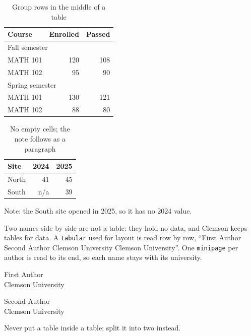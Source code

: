 \documentclass[12pt]{article}
\begin{document}
\begin{table}\centering
  \caption{Group rows in the middle of a table}
  \begin{tabular}{lrr}
    \toprule Course   & Enrolled & Passed \\ \midrule
    \multicolumn{3}{l}{Fall semester} \\
    MATH 101 & 120 & 108 \\
    MATH 102 & 95  & 90  \\
    \multicolumn{3}{l}{Spring semester} \\
    MATH 101 & 130 & 121 \\
    MATH 102 & 88  & 80  \\ \bottomrule
  \end{tabular}
\end{table}
\begin{table}\centering
  \caption[No empty cells]{No empty cells; the note follows as a paragraph}
  \begin{tabular}{lrr}
    \toprule Site & 2024 & 2025 \\ \midrule
    North & 41 & 45 \\
    South & n/a & 39 \\ \bottomrule
  \end{tabular}
\end{table}
\noindent Note: the South site opened in 2025, so it has no 2024 value.


Two names side by side are not a table: they hold no data, and Clemson keeps
tables for data. A \texttt{tabular} used for layout is read row by row,
``First Author Second Author Clemson University Clemson University''. One
\texttt{minipage} per author is read to its end, so each name stays with its
university.

\begin{center}
\begin{minipage}[t]{0.4\linewidth}\centering
  First Author\\ Clemson University
\end{minipage}\hspace{1em}%
\begin{minipage}[t]{0.4\linewidth}\centering
  Second Author\\ Clemson University
\end{minipage}
\end{center}
\noindent Never put a table inside a table; split it into two instead.
\end{document}
